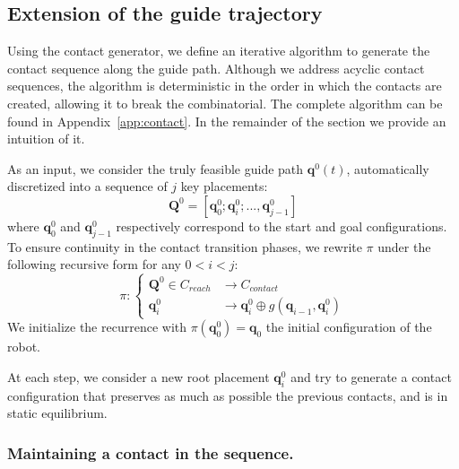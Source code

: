 \subsection{Extension of the guide trajectory}
Using the contact generator, we define an iterative algorithm to generate the contact
sequence along the guide path.
Although we address acyclic contact sequences, the algorithm is deterministic in the order in which 
the contacts are created, allowing it to break the combinatorial.
The complete algorithm can be found in Appendix~\ref{app:contact}.
In the remainder of the section we provide an intuition of it.

As an input, we consider the truly feasible guide path $\mathbf{q}^0(t)$, automatically discretized into a sequence of $j$ key placements:  
\begin{equation*}
	\mathbf{Q}^0 = [\mathbf{q}^0_{0}; \mathbf{q}^0_{i}; ..., \mathbf{q}^0_{j-1}]
\end{equation*} 
where $\mathbf{q}^0_{0}$ and $\mathbf{q}^0_{j-1}$ respectively correspond to the start and goal configurations. To ensure continuity in the contact transition phases, we rewrite $\pi$ under the following recursive form for any $0<i<j$:
\begin{equation*}
    \pi\colon\left\{
    \begin{aligned}		
        \mathbf{Q}^0 \in C_{reach} & \longrightarrow C_{contact} \\
        \mathbf{q}^{0}_i &  \longrightarrow  \mathbf{q}^{0}_i \oplus g(\mathbf{q}_{i - 1},\mathbf{q}^{0}_i) 
    \end{aligned}
    \right.
\end{equation*} 
We initialize the recurrence with $\pi(\mathbf{q}^0_{0}) = \mathbf{q}_0$ the initial configuration of the robot.

At each step, we consider a new root placement $\mathbf{q}^0_{i}$ and try to generate a contact configuration that preserves as much as possible
the previous contacts, and is in static equilibrium.


\subsubsection{Maintaining a contact in the sequence.}


